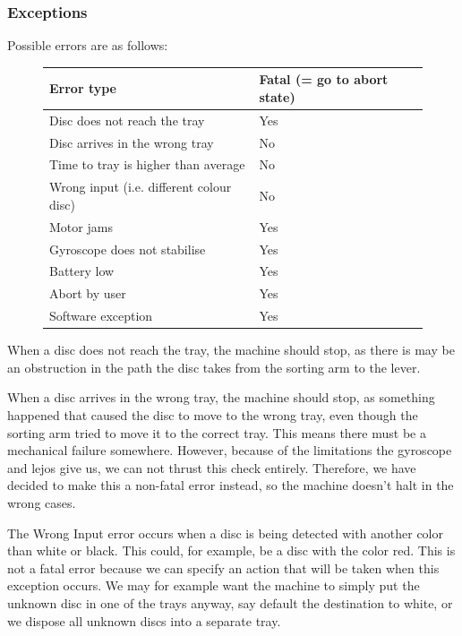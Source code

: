 \documentclass[a4paper,oneside,11pt]{article}
\begin{document}
\subsubsection{Exceptions}
Possible errors are as follows:
\begin{figure}[H]
\centering
\begin{tabular}{|l|l|}
\hline
Error type & Fatal (= go to abort state)\\\hline
Disc does not reach the tray & Yes\\\hline
Disc arrives in the wrong tray & No\\\hline
Time to tray is higher than average & No\\\hline
Wrong input (i.e. different colour disc) & No\\\hline
Motor jams & Yes \\\hline
Gyroscope does not stabilise & Yes \\\hline
Battery low & Yes \\\hline
Abort by user & Yes \\\hline
Software exception & Yes \\\hline
\end{tabular}
\end{figure}
When a disc does not reach the tray, the machine should stop, as there is may be an
obstruction in the path the disc takes from the sorting arm to the lever.

When a disc arrives in the wrong tray, the machine should stop, as something happened
that caused the disc to move to the wrong tray, even though the sorting arm tried to move
it to the correct tray. This means there must be a mechanical failure somewhere. However, because of the limitations the gyroscope and lejos give us, we can not thrust this check entirely. Therefore, we have decided to make this a non-fatal error instead, so the machine doesn't halt in the wrong cases.

The Wrong Input error occurs when a disc is being detected with another color than white
or black. This could, for example, be a disc with the color red. This is not a fatal error because
we can specify an action that will be taken when this exception occurs. We may for example
want the machine to simply put the unknown disc in one of the trays anyway, say default the
destination to white, or we dispose all unknown discs into a separate tray.

\end{document}
